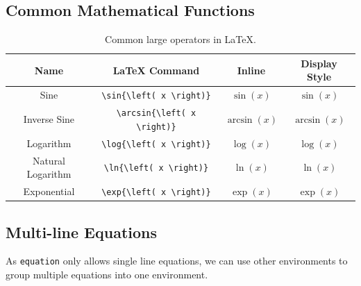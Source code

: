 \documentclass[11pt, twoside]{article}
\begin{document}
\subsection{Common Mathematical Functions}
\begin{table}[H]
    \centering
    \begingroup
    \renewcommand{\arraystretch}{1.2}
    \begin{tabular}{c c c c}
        \toprule
        \textbf{Name}     & \textbf{\LaTeX{} Command}             & \textbf{Inline}               & \textbf{Display Style}                      \\
        \midrule
        Sine              & \lstinline|\sin{\left( x \right)}|    & \(\sin{\left( x \right)}\)    & \(\displaystyle \sin{\left( x \right)}\)    \\ %
        Inverse Sine      & \lstinline|\arcsin{\left( x \right)}| & \(\arcsin{\left( x \right)}\) & \(\displaystyle \arcsin{\left( x \right)}\) \\ %
        Logarithm         & \lstinline|\log{\left( x \right)}|    & \(\log{\left( x \right)}\)    & \(\displaystyle \log{\left( x \right)}\)    \\ %
        Natural Logarithm & \lstinline|\ln{\left( x \right)}|     & \(\ln{\left( x \right)}\)     & \(\displaystyle \ln{\left( x \right)}\)     \\ %
        Exponential       & \lstinline|\exp{\left( x \right)}|    & \(\exp{\left( x \right)}\)    & \(\displaystyle \exp{\left( x \right)}\)    \\ %
        \bottomrule
    \end{tabular}
    \endgroup
    \caption{Common large operators in \LaTeX{}.} %
\end{table}
\subsection{Multi-line Equations}
As \lstinline{equation} only allows single line equations, we can use other environments to group multiple equations into one environment.
\end{document}
